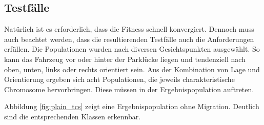 \documentclass[12pt,a4paper]{article}
\begin{document}
\subsection{Testfälle}
Natürlich ist es erforderlich, dass die Fitness schnell konvergiert. Dennoch muss auch beachtet werden, dass die resultierenden Testfälle auch die Anforderungen erfüllen. Die Populationen wurden nach diversen Gesichtspunkten ausgewählt. So kann das Fahrzeug vor oder hinter der Parklücke liegen und tendenziell nach oben, unten, links oder rechts orientiert sein. Aus der Kombination von Lage und Orientierung ergeben sich acht Populationen, die jeweils charakteristische Chromosome hervorbringen. Diese müssen in der Ergebnispopulation auftreten.
\begin{figure}
\centering
\end{figure}
Abbildung \ref{fig:plain_tcs} zeigt eine Ergebnispopulation ohne Migration. Deutlich sind die entsprechenden Klassen erkennbar.
\end{document}
